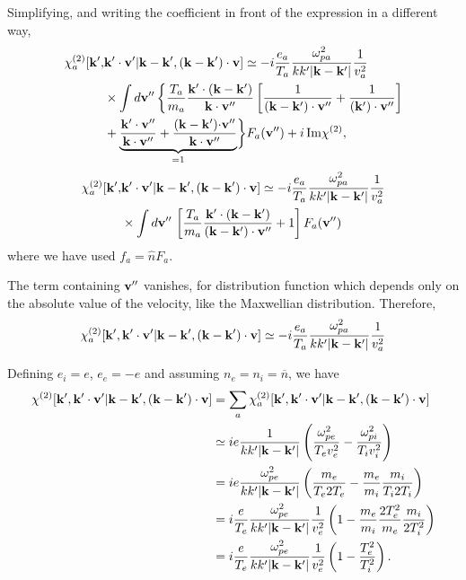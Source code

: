\documentclass[12pt,a4paper,ruledheader]{report}
\begin{document}
\begin{appendix}
Simplifying, and writing the coefficient in front of the expression in a
different way,
\begin{equation}
\begin{split}
\chi_a^{(2)}[{\bf k'},&{\bf k'\cdot v'}|{\bf k-k'},({\bf k-k'})\cdot{\bf v}]
\simeq-i\frac{e_a}{T_a}\frac{\omega_{pa}^2}{k k'|{\bf k-k'}|}\frac{1}{v_{a}^2}\\
&\times\int d{\bf v''}\,\biggl\{\frac{T_a}{m_a}
\frac{{\bf k'}\cdot({\bf k-k'})}{{\bf k}\cdot{\bf v''}}
\left[\frac{1}{({\bf k-k'})\cdot{\bf v''}}
+\frac{1}{({\bf k'})\cdot{\bf v''}}\right]\\
&+\underbrace{ \frac{\bf k'\cdot v''}{\bf k\cdot v''} 
+ \frac{({\bf k}-{\bf k'}){\bf \cdot v''}}{\bf k\cdot v''}}_{=1}
\biggr\} F_a({\bf v''}) + i\,{\rm Im}\chi^{(2)},
\end{split}
\end{equation}
\begin{equation}
  \begin{split}
\chi_a^{(2)}[{\bf k'},&{\bf k'\cdot v'}|{\bf k-k'},({\bf k-k'})\cdot{\bf v}]
\simeq-i\frac{e_a}{T_a}\frac{\omega_{pa}^2}{k k'|{\bf k-k'}|}\frac{1}{v_{a}^2}\\
&\times\int d{\bf v''}\,\left[\frac{T_a}{m_a}
\frac{{\bf k'}\cdot({\bf k-k'})}{({\bf k-k'})\cdot{\bf v''}}+1
\right] F_a({\bf v''})
\end{split}
\end{equation}
where we have used $f_a= \hat{n} F_a$.

The term containing ${\bf v''}$ vanishes, for distribution function which
depends only on the absolute value of the velocity, like the Maxwellian 
distribution. Therefore,
\begin{equation}
\chi_a^{(2)}[{\bf k'},{\bf k'\cdot v'}|{\bf k-k'},({\bf k-k'})\cdot{\bf v}]
\simeq-i\frac{e_a}{T_a}\frac{\omega_{pa}^2}{k k'|{\bf k-k'}|}\frac{1}{v_{a}^2}
\end{equation}

Defining $e_i=e$, $e_e=-e$ and assuming $n_e=n_i=\overline{n}$, we have
\begin{equation}
\begin{split}
\label{chi2,5}
\chi^{(2)}[{\bf k'},{\bf k'\cdot v'}|{\bf k-k'},({\bf k-k'})\cdot{\bf v}]
&= \sum_a\chi_a^{(2)}[{\bf k'},{\bf k'\cdot v'}|{\bf k-k'},({\bf k-k'})\cdot{\bf v}]\\
&\simeq  i e\frac{1}{k k'|{\bf k-k'}|}
\left(\frac{\omega_{pe}^2}{T_e v_{e}^2}-\frac{\omega_{pi}^2}{T_i v_{i}^2}\right)\\
&=i e\frac{\omega_{pe}^2}{k k'|{\bf k-k'}|}
\left(\frac{m_e}{T_e 2T_e}-\frac{m_e}{m_i}\frac{m_i}{T_i 2 T_i}\right)\\
&=i\frac{e}{T_e}\frac{\omega_{pe}^2}{k k'|{\bf k-k'}|}\frac{1}{v_{e}^2}
\left(1-\frac{m_e}{m_i}\frac{2T_e^2}{m_e}\frac{m_i}{2T_i^2}\right)\\
&=i\frac{e}{T_e}\frac{\omega_{pe}^2}{k k'|{\bf k-k'}|}\frac{1}{v_{e}^2}
\left(1-\frac{T_e^2}{T_i^2}\right).
\end{split}
\end{equation}


\end{appendix}
\end{document}
